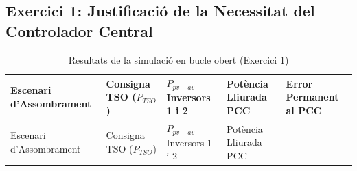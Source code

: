 \documentclass[
  catalan,
  letterpaper,
  DIV=11,
  numbers=noendperiod]{scrartcl}
\begin{document}
\subsection{Exercici 1: Justificació de la Necessitat del Controlador
Central}\label{exercici-1-justificaciuxf3-de-la-necessitat-del-controlador-central}

\begin{longtable}[]{@{}
  >{\raggedright\arraybackslash}p{}
  >{\raggedright\arraybackslash}p{}
  >{\raggedright\arraybackslash}p{}
  >{\raggedright\arraybackslash}p{}
  >{\raggedright\arraybackslash}p{}@{}}
\caption{Resultats de la simulació en bucle obert (Exercici
1)}\label{tbl-ejercicio1}\tabularnewline
\toprule\noalign{}
\begin{minipage}[b]{\linewidth}\raggedright
Escenari d'Assombrament
\end{minipage} & \begin{minipage}[b]{\linewidth}\raggedright
Consigna TSO (\(P_{TSO}\))
\end{minipage} & \begin{minipage}[b]{\linewidth}\raggedright
\(P_{pv-av}\) Inversors 1 i 2
\end{minipage} & \begin{minipage}[b]{\linewidth}\raggedright
Potència Lliurada PCC
\end{minipage} & \begin{minipage}[b]{\linewidth}\raggedright
Error Permanent al PCC
\end{minipage} \\
\midrule\noalign{}
\endfirsthead
\toprule\noalign{}
\begin{minipage}[b]{\linewidth}\raggedright
Escenari d'Assombrament
\end{minipage} & \begin{minipage}[b]{\linewidth}\raggedright
Consigna TSO (\(P_{TSO}\))
\end{minipage} & \begin{minipage}[b]{\linewidth}\raggedright
\(P_{pv-av}\) Inversors 1 i 2
\end{minipage} & \begin{minipage}[b]{\linewidth}\raggedright
Potència Lliurada PCC
\end{minipage} & \begin{minipage}[b]{\linewidth}\raggedright

\end{minipage}
\end{longtable}
\end{document}
